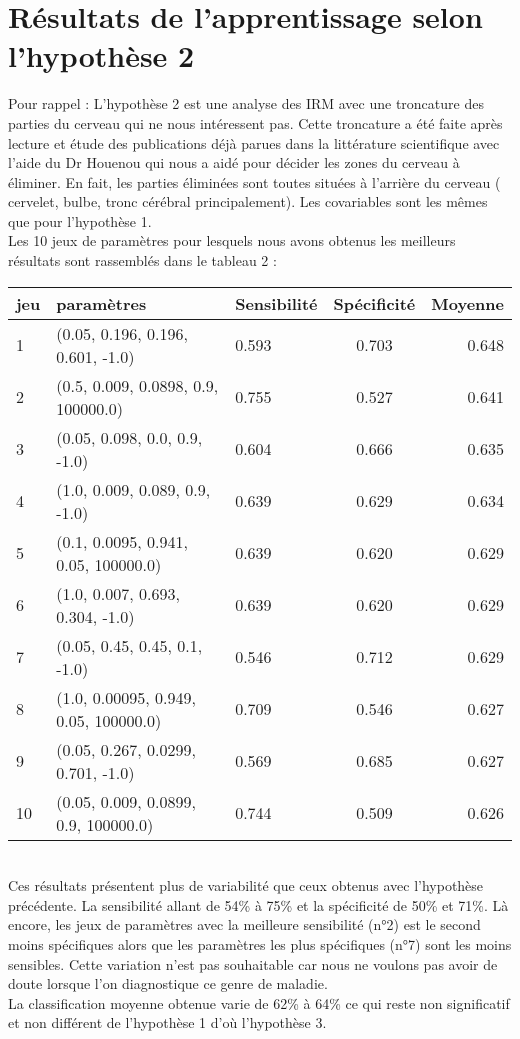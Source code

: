\section{Résultats de l'apprentissage selon l'hypothèse 2 }

Pour rappel : L'hypothèse 2 est une analyse des IRM avec une troncature des parties du cerveau qui ne nous intéressent pas. Cette troncature a été faite après lecture et étude des publications déjà parues dans la littérature scientifique avec l'aide du Dr Houenou qui nous a aidé pour décider les zones du cerveau à éliminer. 
En fait, les parties éliminées sont toutes situées à l'arrière du cerveau ( cervelet, bulbe, tronc cérébral principalement). 
Les covariables sont les mêmes que pour l'hypothèse 1.
\\
Les 10 jeux de paramètres pour lesquels nous avons obtenus les meilleurs résultats sont rassemblés dans le tableau 2 : 

\begin{tabular}{|l|l|l|c|r}
	\hline
	jeu & paramètres & Sensibilité & Spécificité & Moyenne \\
	\hline
	1 & (0.05, 0.196, 0.196, 0.601, -1.0) & 0.593 & 0.703 & 0.648 \\
	2 & (0.5, 0.009, 0.0898, 0.9, 100000.0) & 0.755 & 0.527 & 0.641 \\
	3 & (0.05, 0.098, 0.0, 0.9, -1.0) & 0.604 & 0.666 & 0.635 \\
	4 & (1.0, 0.009, 0.089, 0.9, -1.0) & 0.639 & 0.629 & 0.634 \\
	5 & (0.1, 0.0095, 0.941, 0.05, 100000.0) & 0.639 & 0.620 & 0.629 \\
	6 & (1.0, 0.007, 0.693, 0.304, -1.0) & 0.639 & 0.620 & 0.629 \\
	7 & (0.05, 0.45, 0.45, 0.1, -1.0) & 0.546 & 0.712 & 0.629 \\
	8 & (1.0, 0.00095, 0.949, 0.05, 100000.0) & 0.709 & 0.546 & 0.627 \\
	9 & (0.05, 0.267, 0.0299, 0.701, -1.0) & 0.569 & 0.685 & 0.627 \\
	10 & (0.05, 0.009, 0.0899, 0.9, 100000.0) & 0.744 & 0.509 & 0.626 \\
	\hline
	
\end{tabular}
\\
Ces résultats présentent plus de variabilité que ceux obtenus avec l'hypothèse précédente.
La sensibilité allant de 54\% à 75\% et la spécificité de 50\% et 71\%. Là encore, les jeux de paramètres avec la meilleure sensibilité (n°2) est le second moins spécifiques alors que les paramètres les plus spécifiques (n°7)
sont les moins sensibles.  
Cette variation n'est pas souhaitable car nous ne voulons pas avoir de doute lorsque l'on diagnostique ce genre de maladie. 
\\
La classification moyenne obtenue varie de 62\% à 64\% ce qui reste non significatif et non différent de l'hypothèse 1 d'où l'hypothèse 3.  


